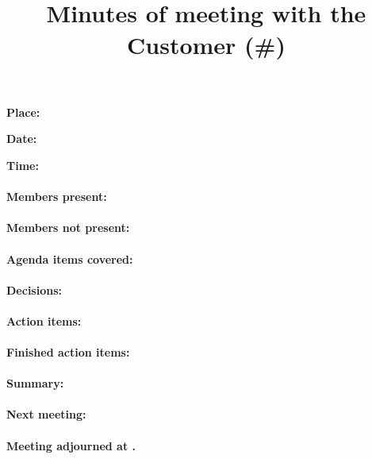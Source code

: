 \documentclass[paper=a4, fontsize=11pt]{article} %
\title{
\horrule{0.5pt} \\[0.4cm] %
\huge Minutes of meeting with the Customer (\#\meetingNumber)
\horrule{2pt} \\[-0.9cm] %
}
\newcounter{foocounter}
\begin{document}
\date{}
\maketitle %

\textbf{Place:} \meetingPlace

\textbf{Date:}  \meetingDate

\textbf{Time:}  \meetingTime

\paragraph{Members present:} \membersPresent

\paragraph{Members not present:} \membersMissing

\paragraph{Agenda items covered:} \hspace{0pt}
\setcounter{foocounter}{0}

\paragraph{Decisions:} \hspace{0pt}
\setcounter{foocounter}{0}

\paragraph{Action items:} \hspace{0pt}
\setcounter{foocounter}{0}

\paragraph{Finished action items:} \hspace{0pt}
\setcounter{foocounter}{0}

\paragraph{Summary:} \summary

\paragraph{Next meeting:} \nextMeeting

\paragraph{Meeting adjourned at \meetingEnd.}
\end{document}
